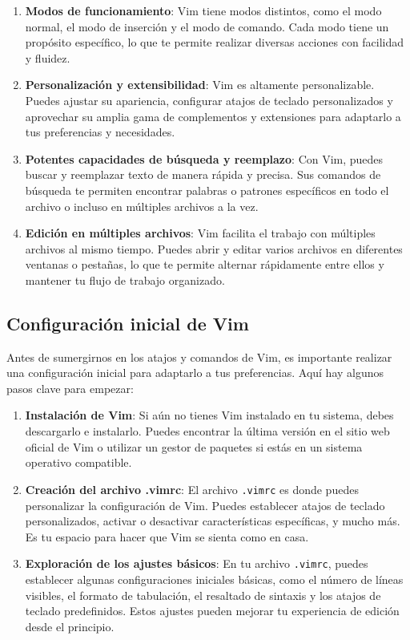 \documentclass[
  doc,
  floatsintext,
  longtable,
  a4paper,
  nolmodern,
  notxfonts,
  notimes,
  12pt,
  colorlinks=true,linkcolor=blue,citecolor=blue,urlcolor=blue]{apa7}
\begin{document}
\begin{enumerate}
\def\labelenumi{\arabic{enumi}.}
\item
  \textbf{Modos de funcionamiento}: Vim tiene modos distintos, como el
  modo normal, el modo de inserción y el modo de comando. Cada modo
  tiene un propósito específico, lo que te permite realizar diversas
  acciones con facilidad y fluidez.
\item
  \textbf{Personalización y extensibilidad}: Vim es altamente
  personalizable. Puedes ajustar su apariencia, configurar atajos de
  teclado personalizados y aprovechar su amplia gama de complementos y
  extensiones para adaptarlo a tus preferencias y necesidades.
\item
  \textbf{Potentes capacidades de búsqueda y reemplazo}: Con Vim, puedes
  buscar y reemplazar texto de manera rápida y precisa. Sus comandos de
  búsqueda te permiten encontrar palabras o patrones específicos en todo
  el archivo o incluso en múltiples archivos a la vez.
\item
  \textbf{Edición en múltiples archivos}: Vim facilita el trabajo con
  múltiples archivos al mismo tiempo. Puedes abrir y editar varios
  archivos en diferentes ventanas o pestañas, lo que te permite alternar
  rápidamente entre ellos y mantener tu flujo de trabajo organizado.
\end{enumerate}

\subsection{Configuración inicial de
Vim}\label{configuraciuxf3n-inicial-de-vim}

Antes de sumergirnos en los atajos y comandos de Vim, es importante
realizar una configuración inicial para adaptarlo a tus preferencias.
Aquí hay algunos pasos clave para empezar:

\begin{enumerate}
\def\labelenumi{\arabic{enumi}.}
\item
  \textbf{Instalación de Vim}: Si aún no tienes Vim instalado en tu
  sistema, debes descargarlo e instalarlo. Puedes encontrar la última
  versión en el sitio web oficial de Vim o utilizar un gestor de
  paquetes si estás en un sistema operativo compatible.
\item
  \textbf{Creación del archivo .vimrc}: El archivo \texttt{.vimrc} es
  donde puedes personalizar la configuración de Vim. Puedes establecer
  atajos de teclado personalizados, activar o desactivar características
  específicas, y mucho más. Es tu espacio para hacer que Vim se sienta
  como en casa.
\item
  \textbf{Exploración de los ajustes básicos}: En tu archivo
  \texttt{.vimrc}, puedes establecer algunas configuraciones iniciales
  básicas, como el número de líneas visibles, el formato de tabulación,
  el resaltado de sintaxis y los atajos de teclado predefinidos. Estos
  ajustes pueden mejorar tu experiencia de edición desde el principio.
\end{enumerate}
\end{document}
